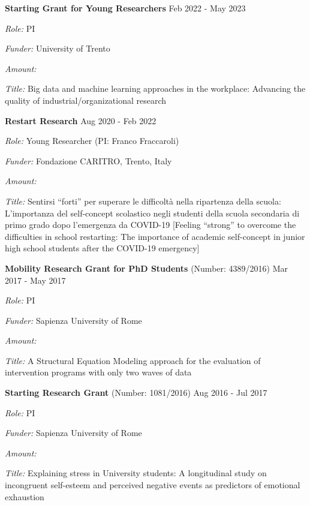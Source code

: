 \documentclass[hidelinks, letterpaper,10pt]{article} %
\begin{document}
	
	\begin{center}
		\parbox{6.5in}{{\textbf{Starting Grant for Young Researchers}}   \hspace{6.5cm} Feb 2022 - May 2023}
		\parbox{6.5in}{\textit{Role:} PI}
		\parbox{6.5in}{\textit{Funder:} University of Trento}
	    \parbox{6.5in}{\textit{Amount:} } 
	    \parbox{6.5in}{\textit{Title:} Big data and machine learning approaches in the workplace: Advancing the quality of industrial/organizational research}
	    \vspace{3mm}
	\end{center}

	\begin{center}
		\parbox{6.5in}{{\textbf{Restart Research}}   \hspace{10cm} Aug 2020 - Feb 2022}
		\parbox{6.5in}{\textit{Role:} Young Researcher (PI: Franco Fraccaroli)}
		\parbox{6.5in}{\textit{Funder:} Fondazione CARITRO, Trento, Italy}
	    \parbox{6.5in}{\textit{Amount:} } 
	    \parbox{6.5in}{\textit{Title:} Sentirsi “forti” per superare le difficoltà nella ripartenza della scuola: L’importanza del self-concept scolastico negli studenti della scuola secondaria di primo grado dopo l’emergenza da COVID-19 [Feeling “strong” to overcome the difficulties in school restarting: The importance of academic self-concept in junior high school students after the COVID-19 emergency]}
	    \vspace{3mm}
	\end{center}
	
	\begin{center}
		\parbox{6.5in}{{\textbf{Mobility Research Grant for PhD Students} (Number: 4389/2016)}   \hspace{2cm} Mar 2017 - May 2017}
		\parbox{6.5in}{\textit{Role:} PI}
		\parbox{6.5in}{\textit{Funder:} Sapienza University of Rome}
		\parbox{6.5in}{\textit{Amount:} }
		\parbox{6.5in}{\textit{Title:} A Structural Equation Modeling approach for the evaluation of intervention programs with only two waves of data}
		\vspace{3mm}
	\end{center}
	
	\begin{center}
		\parbox{6.5in}{{\textbf{Starting Research Grant} (Number: 1081/2016)}   \hspace{5.5cm} Aug 2016 - Jul 2017}
		\parbox{6.5in}{\textit{Role:} PI}
		\parbox{6.5in}{\textit{Funder:} Sapienza University of Rome}
		\parbox{6.5in}{\textit{Amount:} }
		\parbox{6.5in}{\textit{Title:} Explaining stress in University students: A longitudinal study on incongruent self-esteem and perceived negative events as predictors of emotional exhaustion}
	\end{center}
\end{document}
